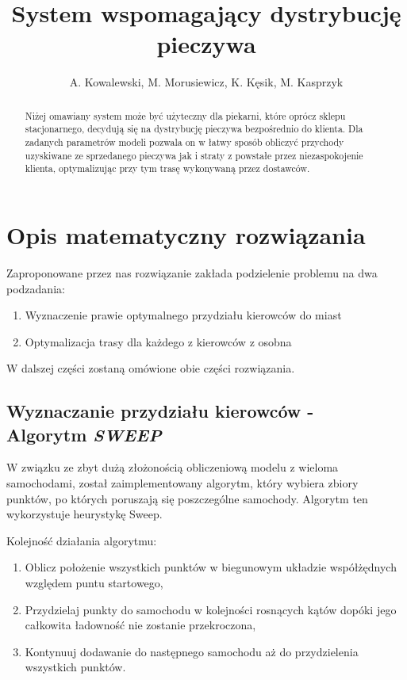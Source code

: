 \documentclass[]{article}
\title{System wspomagający dystrybucję pieczywa}
\author{A. Kowalewski, M. Morusiewicz, K. Kęsik, M. Kasprzyk}
\begin{document}
\maketitle

\begin{abstract}
Niżej omawiany system może być użyteczny dla piekarni, które oprócz sklepu stacjonarnego, decydują się na dystrybucję pieczywa bezpośrednio do klienta. Dla zadanych parametrów modeli pozwala on w łatwy sposób obliczyć przychody uzyskiwane ze sprzedanego pieczywa jak i straty z powstałe przez niezaspokojenie klienta, optymalizując przy tym trasę wykonywaną przez dostawców. 
\end{abstract}

\section{Opis matematyczny rozwiązania}

Zaproponowane przez nas rozwiązanie zakłada podzielenie problemu na dwa podzadania:
\begin{enumerate}
	\item Wyznaczenie prawie optymalnego przydziału kierowców do miast
	\item Optymalizacja trasy dla każdego z kierowców z osobna
\end{enumerate}
W dalszej części zostaną omówione obie części rozwiązania.

\subsection{Wyznaczanie przydziału kierowców - \\Algorytm \textit{SWEEP}}

W związku ze zbyt dużą złożonością obliczeniową modelu z wieloma samochodami, został zaimplementowany algorytm, który wybiera zbiory punktów, po których poruszają się poszczególne samochody. Algorytm ten wykorzystuje heurystykę Sweep.

Kolejność działania algorytmu:
\begin{enumerate}
	\item Oblicz położenie wszystkich punktów w biegunowym układzie współżędnych względem puntu startowego,
	\item Przydzielaj punkty do samochodu w kolejności rosnących kątów dopóki jego całkowita ładowność nie zostanie przekroczona,
	\item Kontynuuj dodawanie do następnego samochodu aż do przydzielenia wszystkich punktów.
\end{enumerate}
\end{document}
